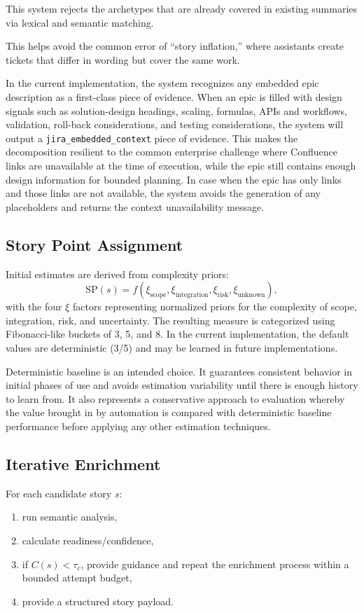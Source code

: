 \documentclass[10pt,a4paper]{article}
\begin{document}
This system rejects the archetypes that are already covered in existing summaries via lexical and semantic matching.

This helps avoid the common error of ``story inflation,'' where assistants create tickets that differ in wording but cover the same work.

In the current implementation, the system recognizes any embedded epic description as a first-class piece of evidence. When an epic is filled with design signals such as solution-design headings, scaling, formulas, APIs and workflows, validation, roll-back considerations, and testing considerations, the system will output a \texttt{jira\_embedded\_context} piece of evidence. This makes the decomposition resilient to the common enterprise challenge where Confluence links are unavailable at the time of execution, while the epic still contains enough design information for bounded planning. In case when the epic has only links and those links are not available, the system avoids the generation of any placeholders and returns the context unavailability message.

\subsection{Story Point Assignment}
Initial estimates are derived from complexity priors:
\begin{equation}
\mathrm{SP}(s) = f(\xi_{\text{scope}}, \xi_{\text{integration}}, \xi_{\text{risk}}, \xi_{\text{unknown}}),
\end{equation}
with the four $\xi$ factors representing normalized priors for the complexity of scope, integration, risk, and uncertainty. The resulting measure is categorized using Fibonacci-like buckets of 3, 5, and 8. In the current implementation, the default values are deterministic (3/5) and may be learned in future implementations.

Deterministic baseline is an intended choice. It guarantees consistent behavior in initial phases of use and avoids estimation variability until there is enough history to learn from. It also represents a conservative approach to evaluation whereby the value brought in by automation is compared with deterministic baseline performance before applying any other estimation techniques.

\subsection{Iterative Enrichment}
For each candidate story $s$:
\begin{enumerate}
  \item run semantic analysis,
  \item calculate readiness/confidence,
  \item if $C(s)<\tau_c$, provide guidance and repeat the enrichment process within a bounded attempt budget,
  \item provide a structured story payload.
\end{enumerate}
\end{document}
